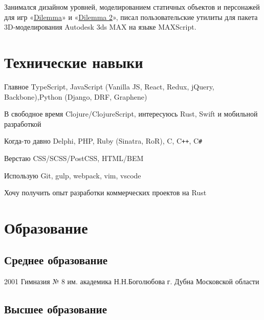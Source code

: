 \documentclass[11pt,a4paper,sans]{moderncv}
\newcommand{\lang}[2]{#1}
\begin{document}
\cvlistitem
    {\lang
        {Занимался дизайном уровней, моделированием статичных объектов и персонажей для игр «\href{http://ru.akella.com/Game.aspx?id=354}{Dilemma}» и «\href{http://ru.akella.com/Game.aspx?id=1898}{Dilemma 2}», писал пользовательские утилиты для пакета 3D-моделирования Autodesk 3ds MAX на языке MAXScript.}
        {TODO}\newline}


\section
    {\lang
        {Технические навыки}
        {Technical Skills}}

\cvline
    {\lang
        {Главное}
        {Main}}
    {TypeScript, JavaScript (Vanilla JS, React, Redux, jQuery, Backbone),\newline Python (Django, DRF, Graphene)}

\cvline
    {\lang
        {В свободное время}
        {TODO}}
    {Clojure/ClojureScript, интересуюсь Rust, Swift и мобильной разработкой}

\cvline
    {\lang
        {Когда-то давно}
        {TODO}}
    {Delphi, PHP, Ruby (Sinatra, RoR), C, C\texttt{++}, C\texttt{\#}}

\cvline
    {\lang
        {Верстаю}
        {TODO}}
    {CSS/SCSS/PostCSS, HTML/BEM}

\cvline
    {\lang
        {Использую}
        {TODO}}
    {Git, gulp, webpack, vim, vscode}

\cvline
    {\lang
        {Хочу получить опыт}
        {TODO}}
    {\lang
        {разработки коммерческих проектов на Rust}
        {TODO}}


\section
    {\lang
        {Образование}
        {Education}}


\subsection
    {\lang
        {Среднее образование}
        {Secondary school }}

\cventry
    {2001}
    {\lang
        {Гимназия № 8 им. академика Н.Н.Боголюбова}
        {TODO}}
    {\lang
        {г. Дубна Московской области}
        {Dubna}}
    {}
    {}
    {}


\subsection
    {\lang
        {Высшее образование}
        {Higher education}}
\end{document}
